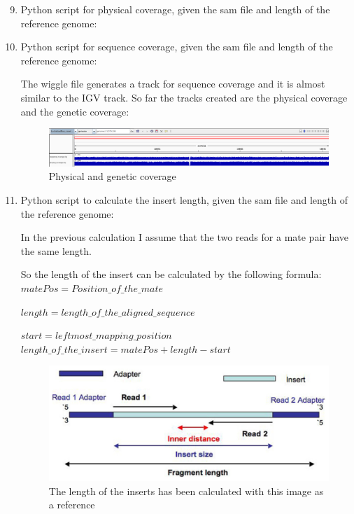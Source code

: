 \begin{enumerate}
\setcounter{enumi}{8}
  \item Python script for physical coverage, given the sam file and
length of the reference genome:

  \item Python script for sequence coverage, given the sam file and
length of the reference genome:

The wiggle file generates a track for sequence coverage and it is almost
similar to the IGV track.
So far the tracks created are the physical coverage and the genetic coverage:

\begin{figure}[h]
  \centering
  \includegraphics[scale=0.2]{img/ps_tracks}
  \caption{Physical and genetic coverage}
\end{figure}

  \item Python script to calculate the insert length, given the sam file and
length of the reference genome:


In the previous calculation I assume that the two reads for a mate pair have
the same length.

So the length of the insert can be calculated by the following formula: \\

$matePos = Position\_of\_the\_mate$

$length = length\_of\_the\_aligned\_sequence$

$start = leftmost\_mapping\_position$ \\

$length\_of\_the\_insert = matePos + length - start$

\begin{figure}[h]
  \centering
  \includegraphics[scale=0.35]{img/insert_img}
  \caption{The length of the inserts has been calculated with this image as a reference}
\end{figure}


\end{enumerate}
